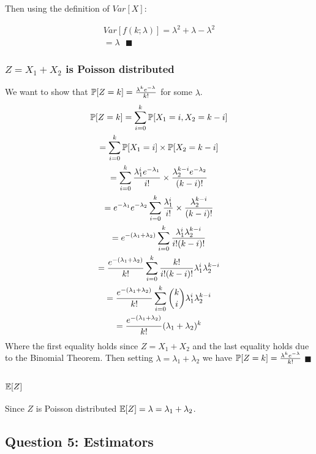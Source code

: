 \documentclass[11pt, oneside]{article}   	%
\begin{document}
Then using the definition of $Var[X]$:

\begin{gather*}
Var[f(k; \lambda)] = \lambda^2 + \lambda - \lambda^2\\
= \lambda \text{ } \blacksquare
\end{gather*}

\subsubsection{$Z = X_1 + X_2$ is Poisson distributed}
We want to show that $\Bbb P[Z = k] = \frac{\lambda^k e^{-\lambda}}{k!}$ for some $\lambda$.
\begin{gather*}
\Bbb P[Z = k] = \sum_{i = 0}^{k} \Bbb P[X_1 = i, X_2 = k - i]\\
= \sum_{i = 0}^{k} \Bbb P[X_1 = i] \times \Bbb P[X_2 = k - i]\\
= \sum_{i = 0}^{k} \frac{\lambda_1^i e^{-\lambda_1}}{i!} \times \frac{\lambda_2^{k - i} e^{-\lambda_2}}{(k - i)!}\\
= e^{-\lambda_1}e^{-\lambda_2} \sum_{i = 0}^{k} \frac{\lambda_1^i }{i!} \times \frac{\lambda_2^{k - i} }{(k - i)!}\\
= e^{- (\lambda_1 + \lambda_2)} \sum_{i = 0}^{k} \frac{\lambda_1^{i} \lambda_2^{k - i} }{i!(k - i)!}\\
= \frac{e^{- (\lambda_1 + \lambda_2)}}{k!} \sum_{i = 0}^{k} \frac{k!}{i!(k - i)!}\lambda_1^{i} \lambda_2^{k - i} \\
= \frac{e^{- (\lambda_1 + \lambda_2)}}{k!} \sum_{i = 0}^{k} {k \choose i}\lambda_1^{i} \lambda_2^{k - i} \\
= \frac{e^{- (\lambda_1 + \lambda_2)}}{k!} (\lambda_1 + \lambda_2)^k \\
\end{gather*}
Where the first equality holds since $Z = X_1 + X_2$ and the last equality holds due to the Binomial Theorem.  Then setting $\lambda = \lambda_1 + \lambda_2$ we have $\Bbb P[Z = k] = \frac{\lambda^k e^{-\lambda}}{k!}$ $\blacksquare$

\subsubsection{$\Bbb E[Z]$}
Since $Z$ is Poisson distributed $\Bbb E[Z] = \lambda = \lambda_1 + \lambda_2$.

\subsection{Question 5: Estimators}
\end{document}
